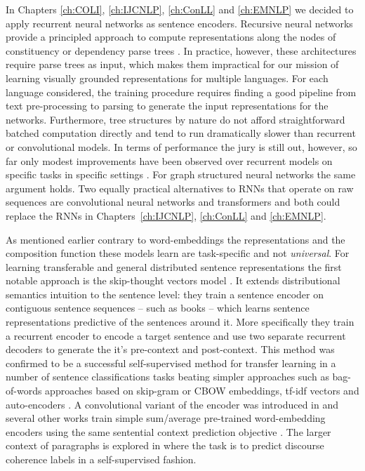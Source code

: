 In Chapters \ref{ch:COLI}, \ref{ch:IJCNLP}, \ref{ch:ConLL} and \ref{ch:EMNLP} we decided to apply
recurrent neural networks as sentence encoders.
Recursive neural networks provide a principled approach to
compute representations along the nodes of constituency
or dependency parse trees \citep{socher2013recursive,socher2014grounded,le2015compositional,kai2015treelstm}.
In practice, however, these architectures require parse trees as input,
which makes them impractical for our mission of learning visually grounded
representations for multiple languages.
For each language considered, the training procedure requires finding a good
pipeline from text pre-processing to parsing to generate the input representations
for the networks. Furthermore, tree structures by nature do not
afford straightforward batched computation directly and tend to run dramatically
slower than recurrent or convolutional models. In terms of performance the jury
is still out, however, so far only modest improvements have been observed
over recurrent models on specific tasks in specific settings
\citep{li2015tree,kai2015treelstm}. For graph structured neural networks the
same argument holds. Two equally practical alternatives to RNNs
that operate on raw sequences are convolutional neural networks
\citep{bai2018empirical} and transformers \citep{vaswani2017attention} and both could
replace the RNNs in Chapters~\ref{ch:IJCNLP}, \ref{ch:ConLL} and \ref{ch:EMNLP}.


As mentioned earlier contrary to word-embeddings the representations
and the composition function these models learn are task-specific and not \emph{universal}.
For learning transferable and general distributed sentence representations the
first notable approach is the
skip-thought vectors model \citep{kiros2015skip}.
It extends distributional semantics intuition to the sentence level:
they train a sentence encoder on contiguous sentence sequences
-- such as books -- which learns sentence representations predictive of the sentences around it.
More specifically
they train a recurrent encoder to encode a target sentence and use two separate recurrent decoders to
generate the it's pre-context and post-context.
This method was confirmed to be a successful self-supervised method for transfer
learning in a number of sentence
classifications tasks beating simpler approaches such as bag-of-words approaches based on skip-gram
or CBOW embeddings, tf-idf vectors and auto-encoders \citep{hill2016learning}. A convolutional
variant of the encoder was introduced in \cite{gan2016unsupervised} and several other works
train simple sum/average pre-trained word-embedding encoders using the same sentential
context prediction objective \citep{kenter2016siamese,hill2016learning}. The larger context of paragraphs is
explored in \cite{jernite2017discourse} where the task is to predict discourse coherence
labels in a self-supervised fashion.

